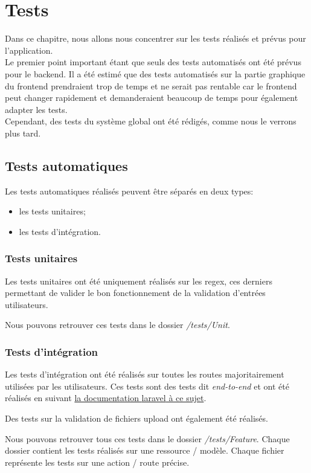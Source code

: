 \documentclass[
    iai, %
    il, %
]{heig-tb}
\begin{document}
\section{Tests}
Dans ce chapitre, nous allons nous concentrer sur les tests réalisés et prévus pour l'application. \\
Le premier point important étant que seuls des tests automatisés ont été prévus pour le \Gls{backend}. Il a été estimé que des tests automatisés sur la partie graphique du \Gls{frontend} prendraient trop de temps et ne serait pas rentable car le \Gls{frontend} peut changer rapidement et demanderaient beaucoup de temps pour également adapter les tests. \\
Cependant, des tests du système global ont été rédigés, comme nous le verrons plus tard.

\subsection{Tests automatiques}

Les tests automatiques réalisés peuvent être séparés en deux types:
\begin{itemize}
    \item les tests unitaires;
    \item les tests d'intégration.
\end{itemize}

\subsubsection{Tests unitaires}
Les tests unitaires ont été uniquement réalisés sur les \Gls{regex}, ces derniers permettant de valider le bon fonctionnement de la validation d'entrées utilisateurs.

Nous pouvons retrouver ces tests dans le dossier \emph{/tests/Unit}.

\subsubsection{Tests d'intégration}
Les tests d'intégration ont été réalisés sur toutes les routes majoritairement utilisées par les utilisateurs. Ces tests sont des tests dit \emph{end-to-end} et ont été réalisés en suivant \href{https://laravel.com/docs/9.x/http-tests}{la documentation \Gls{laravel} à ce sujet}.

Des tests sur la validation de fichiers upload ont également été réalisés.

Nous pouvons retrouver tous ces tests dans le dossier \emph{/tests/Feature}. Chaque dossier contient les tests réalisés sur une ressource / modèle. Chaque fichier représente les tests sur une action / route précise.
\end{document}
